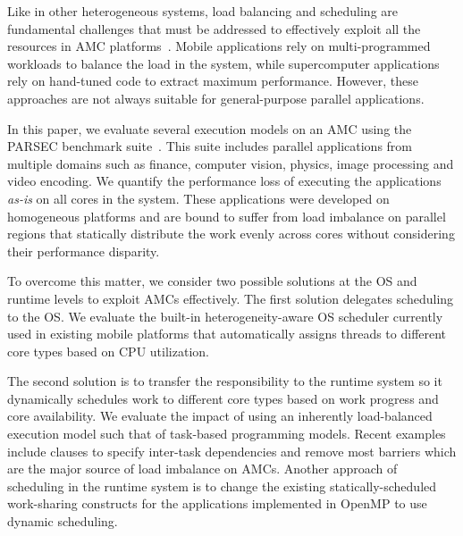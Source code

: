 Like in other heterogeneous systems, load balancing and scheduling are fundamental challenges that must be addressed to effectively exploit all the resources in AMC platforms~\cite{Suleman:APLOS2009,Fedorova2009,Greenhalgh2011,Joao:ASPLOS2012,Joao:ISCA2013,ARM4HPC_SC13}. 
Mobile applications rely on multi-programmed workloads to balance the load in the system, while supercomputer applications rely on hand-tuned code to extract maximum performance. 
However, these approaches are not always suitable for general-purpose parallel applications.

In this paper, we evaluate several execution models on an AMC using the PARSEC benchmark suite~\cite{PARSEC3}. 
This suite includes parallel applications from multiple domains such as finance, computer vision, physics, image processing and video encoding. 
We quantify the performance loss of executing the applications \textit{as-is} on all cores in the system. 
These applications were developed on homogeneous platforms and are bound to suffer from load imbalance on parallel regions that statically distribute the work evenly across cores without considering their performance disparity.

To overcome this matter, we consider two possible solutions at the OS and runtime levels to exploit AMCs effectively.
The first solution delegates scheduling to the OS.
We evaluate the built-in heterogeneity-aware OS scheduler currently used in existing mobile platforms that automatically assigns threads to different core types based on CPU utilization. 

The second solution is to transfer the responsibility to the runtime system so it dynamically schedules work to different core types based on work progress and core availability. 
We evaluate the impact of using an inherently load-balanced execution model such that of task-based programming models. 
Recent examples~\cite{Ayguade:TPDS2009, OpenMP4.0:Manual2013, OmpSs_PPL11, vectorMulticore, Bauer.2012.SC,rollback,Vandierendonck:PACT2011, Vandierendonck:Hyperq,spawn} include clauses to specify inter-task dependencies and remove most barriers which are the major source of load imbalance on AMCs.
Another approach of scheduling in the runtime system is to change the existing statically-scheduled work-sharing constructs for the applications implemented in OpenMP to use dynamic scheduling. 
\fi

